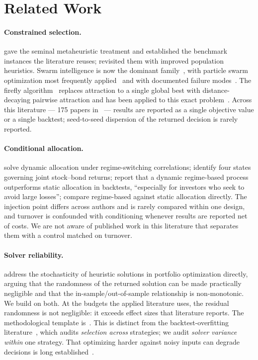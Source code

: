 \documentclass[sigconf,anonymous,review]{acmart}
\begin{document}
\section{Related Work}

\paragraph{Constrained selection.} \citet{Chang2000} gave the seminal metaheuristic
treatment and established the benchmark instances the literature reuses;
\citet{WoodsideOriakhi2011} revisited them with improved population heuristics.
Swarm intelligence is now the dominant family~\cite{Ertenlice2018}, with particle
swarm optimization most frequently applied~\cite{Cura2009,Zhu2011} and with
documented failure modes~\cite{Deng2012}. The firefly
algorithm~\cite{Yang2008,Fister2013} replaces attraction to a single global best
with distance-decaying pairwise attraction and has been applied to this exact
problem~\cite{Bacanin2014}. Across this literature --- 175 papers
in~\cite{Kalayci2019} --- results are reported as a single objective value or a
single backtest; seed-to-seed dispersion of the returned decision is rarely
reported.

\paragraph{Conditional allocation.} \citet{AngBekaert2002} solve dynamic allocation
under regime-switching correlations; \citet{GuidolinTimmermann2007} identify four
states governing joint stock--bond returns; \citet{Kritzman2012} report that a
dynamic regime-based process outperforms static allocation in backtests,
``especially for investors who seek to avoid large losses'';
\citet{Nystrup2015} compare regime-based against static allocation directly. The
injection point differs across authors and is rarely compared within one design,
and turnover is confounded with conditioning whenever results are reported net of
costs. We are not aware of published work in this literature that separates them
with a control matched on turnover.

\paragraph{Solver reliability.} \citet{GilliSchumann2011} address the stochasticity
of heuristic solutions in portfolio optimization directly, arguing that the
randomness of the returned solution can be made practically negligible and that the
in-sample/out-of-sample relationship is non-monotonic. We build on both. At the
budgets the applied literature uses, the residual randomness is not negligible: it
exceeds effect sizes that literature reports. The methodological template
is~\citet{Henderson2018}. This is distinct from the backtest-overfitting
literature~\cite{Bailey2014,Bailey2017}, which audits \emph{selection across}
strategies; we audit \emph{solver variance within} one strategy. That optimizing
harder against noisy inputs can degrade decisions is long
established~\cite{Michaud1989,DeMiguel2009,BottouBousquet2007}.
\end{document}
